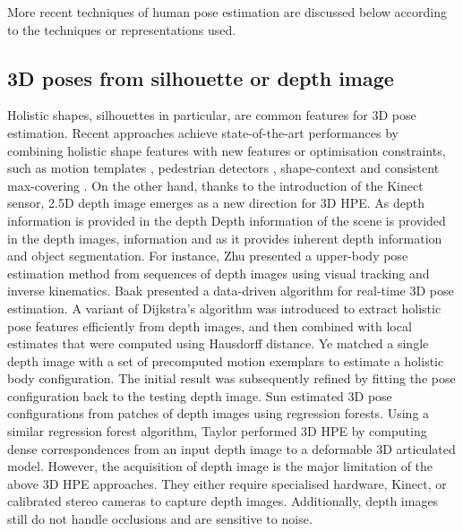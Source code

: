 More recent techniques of human pose estimation are discussed below according to the techniques or representations used.

\subsection{3D poses from silhouette or depth image} 
Holistic shapes, silhouettes in particular, are common features for 3D pose estimation. 
Recent approaches achieve state-of-the-art performances by combining holistic shape features with new features or optimisation constraints, such as motion templates \cite{Rogez2012}, pedestrian detectors \cite{Andriluka2010}, shape-context \cite{Agarwal2006} and consistent max-covering \cite{Jiang2011}. 
On the other hand, thanks to the introduction of the Kinect sensor, 2.5D depth image emerges as a new direction for 3D HPE. 
As depth information is provided in the depth 
Depth information of the scene is provided in the depth images, information and as it provides inherent depth information and object segmentation. 
For instance, Zhu \etal \cite{Zhu2008a} presented a upper-body pose estimation method from sequences of depth images using visual tracking and inverse kinematics. 
Baak \etal \cite{Baak2011} presented a data-driven algorithm for real-time 3D pose estimation. A variant of Dijkstra's algorithm was introduced to extract holistic pose features efficiently from depth images, and then combined with local estimates that were computed using Hausdorff distance. 
Ye \etal \cite{Ye2011} matched a single depth image with a set of precomputed motion exemplars to estimate a holistic body configuration. The initial result was subsequently refined by fitting the pose configuration back to the testing depth image. 
Sun \etal \cite{Sun2012} estimated 3D pose configurations from patches of depth images using regression forests.  
Using a similar regression forest algorithm, Taylor \etal \cite{Taylor2012} performed 3D HPE by computing dense correspondences from an input depth image to a deformable 3D articulated model.  
However, the acquisition of depth image is the major limitation of the above 3D HPE approaches. They either require specialised hardware, \eg Kinect, or calibrated stereo cameras to capture depth images. Additionally, depth images still do not handle occlusions and are sensitive to noise. 

